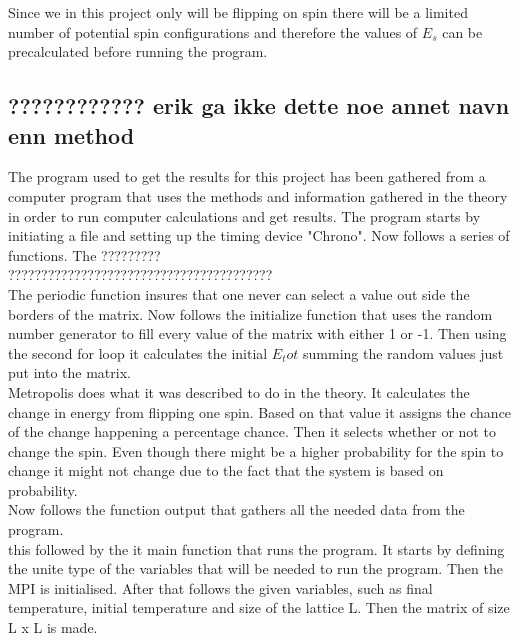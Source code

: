 \documentclass{article}
\begin{document}
Since we in this project only will be flipping on spin there will be a limited number of potential spin configurations and therefore the values of $E_s$ can be precalculated before running the program. \\


\subsection{???????????? erik ga ikke dette noe annet navn enn method}


The program used to get the results for this project has been gathered from a computer program that uses the methods and information gathered in the theory in order to run computer calculations and get results. The program starts by initiating a file and setting up the timing device "Chrono". Now follows a series of functions. The ????????? \\

????????????????????????????????????????\\

The periodic function insures that one never can select a value out side the borders of the matrix. Now follows the initialize function that uses the random number generator to fill every value of the matrix with either 1 or -1. Then using the second for loop it calculates the initial $E_tot$ summing the random values just put into the matrix. \\

Metropolis does what it was described to do in the theory. It calculates the change in energy from flipping one spin. Based on that value it assigns the chance of the change happening a percentage chance. Then it selects whether or not to change the spin. Even though there might be a higher probability for the spin to change it might not change due to the fact that the system is based on probability. \\

Now follows the function output that gathers all the needed data from the program. \\

this followed by the it main function that runs the program. It starts by defining the unite type of the variables that will be needed to run the program. Then the MPI is initialised. After that follows the given variables, such as final temperature, initial temperature and size of the lattice L. Then the matrix of size L x L is made.\\
\end{document}
